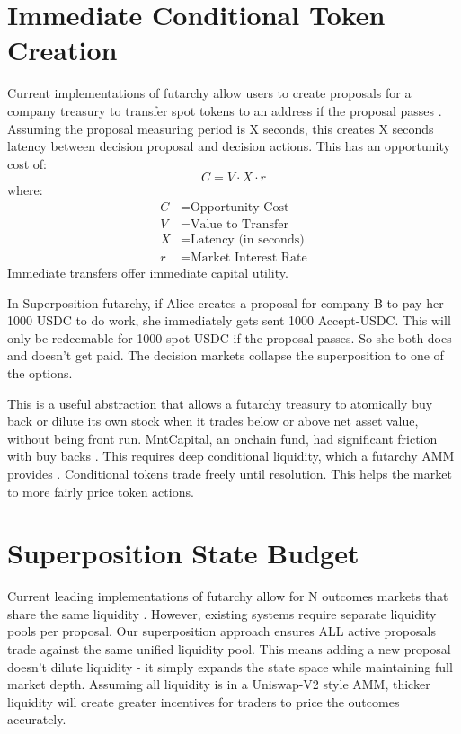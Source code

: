 \documentclass{article}
\begin{document}
\section{Immediate Conditional Token Creation}

Current implementations of futarchy allow users to create proposals for a company treasury to transfer spot tokens to an address if the proposal passes \cite{govex}. Assuming the proposal measuring period is X seconds, this creates X seconds latency between decision proposal and decision actions. This has an opportunity cost of:
\begin{equation}
    C = V \cdot X \cdot r
\end{equation}
where:
\begin{align*}
    C &= \text{Opportunity Cost} \\
    V &= \text{Value to Transfer} \\
    X &= \text{Latency (in seconds)} \\
    r &= \text{Market Interest Rate}
\end{align*}
Immediate transfers offer immediate capital utility.

In Superposition futarchy, if Alice creates a proposal for company B to pay her 1000 USDC to do work, she immediately gets sent 1000 Accept-USDC. This will only be redeemable for 1000 spot USDC if the proposal passes. So she both does and doesn't get paid. The decision markets collapse the superposition to one of the options.

This is a useful abstraction that allows a futarchy treasury to atomically buy back or dilute its own stock when it trades below or above net asset value, without being front run. MntCapital, an onchain fund, had significant friction with buy backs \cite{mntcapital}. This requires deep conditional liquidity, which a futarchy AMM provides \cite{metadao}. Conditional tokens trade freely until resolution. This helps the market to more fairly price token actions.

\section{Superposition State Budget}

Current leading implementations of futarchy allow for N outcomes markets that share the same liquidity \cite{govex2}. However, existing systems require separate liquidity pools per proposal. Our superposition approach ensures ALL active proposals trade against the same unified liquidity pool. This means adding a new proposal doesn't dilute liquidity - it simply expands the state space while maintaining full market depth. Assuming all liquidity is in a Uniswap-V2 style AMM, thicker liquidity will create greater incentives for traders to price the outcomes accurately.
\end{document}
